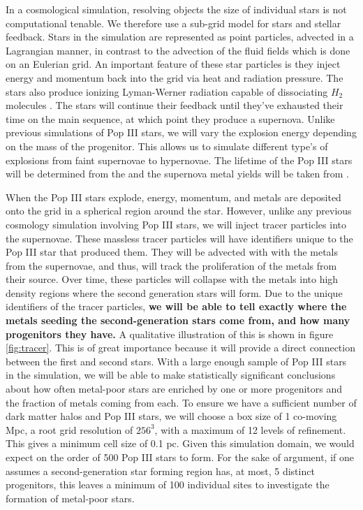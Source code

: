 \documentclass[a4paper, 12pt]{article}
\begin{document}
In a cosmological simulation, resolving objects the size of individual stars is not computational tenable. We therefore use a sub-grid model for stars and stellar feedback. Stars in the simulation are represented as point particles, advected in a Lagrangian manner, in contrast to the advection of the fluid fields which is done on an Eulerian grid. An important feature of these star particles is they inject energy and momentum back into the grid via heat and radiation pressure. The stars also produce ionizing Lyman-Werner radiation capable of dissociating $H_2$ molecules \citep{...}. The stars will continue their feedback until they've exhausted their time on the main sequence, at which point they produce a supernova. Unlike previous simulations of Pop III stars, we will vary the explosion energy depending on the mass of the progenitor. This allows us to simulate different type's of explosions from faint supernovae to hypernovae. The lifetime of the Pop III stars will be determined from the \cite{Schaerer2002} and the supernova metal yields will be taken from \cite{Nomoto2006}.

When the Pop III stars explode, energy, momentum, and metals are deposited onto the grid in a spherical region around the star. However, unlike any previous cosmology simulation involving Pop III stars, we will inject tracer particles into the supernovae. These massless tracer particles will have identifiers unique to the Pop III star that produced them. They will be advected with with the metals from the supernovae, and thus, will track the proliferation of the metals from their source. Over time, these particles will collapse with the metals into high density regions where the second generation stars will form. Due to the unique identifiers of the tracer particles, \textbf{we will be able to tell exactly where the metals seeding the second-generation stars come from, and how many progenitors they have.} A qualitative illustration of this is shown in figure \ref{fig:tracer}. This is of great importance because it will provide a direct connection between the first and second stars. With a large enough sample of Pop III stars in the simulation, we will be able to make statistically significant conclusions about how often metal-poor stars are enriched by one or more progenitors and the fraction of metals coming from each. To ensure we have a sufficient number of dark matter halos and Pop III stars, we will choose a box size of 1 co-moving Mpc, a root grid resolution of $256^3$, with a maximum of 12 levels of refinement. This gives a minimum cell size of 0.1 pc. Given this simulation domain, we would expect on the order of 500 Pop III stars to form. For the sake of argument, if one assumes a second-generation star forming region has, at most, 5 distinct progenitors, this leaves a minimum of 100 individual sites to investigate the formation of metal-poor stars.
\end{document}
